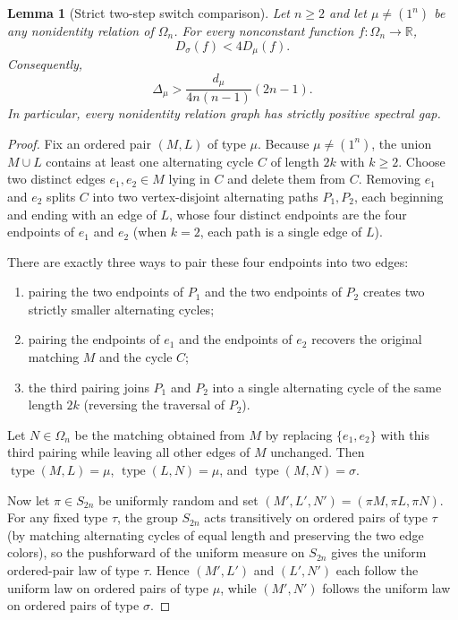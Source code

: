 \documentclass[11pt]{article}
\newtheorem{lemma}[theorem]{Lemma}
\theoremstyle{remark}
\newcommand{\R}{\mathbb{R}}
\DeclareMathOperator{\type}{type}
\begin{document}
\begin{lemma}[Strict two-step switch comparison]\label{lem:switch-compare}
Let $n \ge 2$ and let $\mu \neq (1^n)$ be any nonidentity relation of $\Omega_n$.
For every nonconstant function $f \colon \Omega_n \to \R$,
\[
  D_\sigma(f) < 4 D_\mu(f).
\]
Consequently,
\[
  \Delta_\mu > \frac{d_\mu}{4 n(n-1)} (2n - 1).
\]
In particular, every nonidentity relation graph has strictly positive spectral
gap.
\end{lemma}

\begin{proof}
Fix an ordered pair $(M, L)$ of type $\mu$. Because $\mu \neq (1^n)$, the union
$M \cup L$ contains at least one alternating cycle $C$ of length $2k$ with
$k \ge 2$. Choose two distinct edges $e_1, e_2 \in M$ lying in $C$ and delete
them from $C$. Removing $e_1$ and $e_2$ splits $C$ into two vertex-disjoint
alternating paths $P_1, P_2$, each beginning and ending with an edge of $L$,
whose four distinct endpoints are the four endpoints of $e_1$ and $e_2$ (when
$k = 2$, each path is a single edge of $L$).

There are exactly three ways to pair these four endpoints into two edges:
\begin{enumerate}
  \item pairing the two endpoints of $P_1$ and the two endpoints of $P_2$
  creates two strictly smaller alternating cycles;
  \item pairing the endpoints of $e_1$ and the endpoints of $e_2$ recovers the
  original matching $M$ and the cycle $C$;
  \item the third pairing joins $P_1$ and $P_2$ into a single alternating cycle
  of the same length $2k$ (reversing the traversal of $P_2$).
\end{enumerate}
Let $N \in \Omega_n$ be the matching obtained from $M$ by replacing $\{e_1, e_2\}$
with this third pairing while leaving all other edges of $M$ unchanged. Then
$\type(M, L) = \mu$, $\type(L, N) = \mu$, and $\type(M, N) = \sigma$.

Now let $\pi \in S_{2n}$ be uniformly random and set
$(M', L', N') = (\pi M, \pi L, \pi N)$. For any fixed type $\tau$, the group
$S_{2n}$ acts transitively on ordered pairs of type $\tau$ (by matching
alternating cycles of equal length and preserving the two edge colors), so the
pushforward of the uniform measure on $S_{2n}$ gives the uniform ordered-pair
law of type $\tau$. Hence $(M', L')$ and $(L', N')$ each follow the uniform
law on ordered pairs of type $\mu$, while $(M', N')$ follows the uniform law on
ordered pairs of type $\sigma$.


\end{proof}
\end{document}
